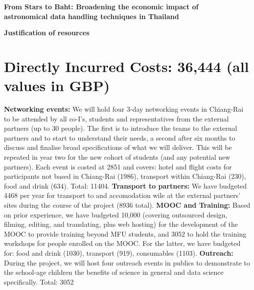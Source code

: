 \documentclass[11pt]{article}
\begin{document}
  \setcounter{figure}{0}
  \noindent
  {\LARGE \bf From Stars to Baht: Broadening the economic impact of \\
  astronomical data handling techniques in Thailand}
  
  \vspace{3mm}
  \noindent
  {\LARGE \bf Justification of resources }
  \vspace{-3mm}
  \section{Directly Incurred Costs: 36,444 (all values in GBP)}
  \vspace{-3mm}
  {\bf Networking events:} We will hold four 3-day networking events in Chiang-Rai to be attended by all co-I's, students and representatives from the external partners (up to 30 people). The first is to introduce the teams to the external partners and to start to understand their needs, a second after six months to discuss and finalise broad specifications of what we will deliver. This will be repeated in year two for the new cohort of students (and any potential new partners). Each event is costed at 2851 and covers: hotel and flight costs for participants not based in Chiang-Rai (1986), transport within Chiang-Rai (230), food and drink (634). Total: 11404. {\bf Transport to partners:} We have budgeted 4468 per year for transport to and accomodation wile at the external partners' sites during the course of the project (8936 total). {\bf MOOC and Training:} Based on prior experience, we have budgeted 10,000 (covering outsourced design, filming, editing, and translating, plus web hosting) for the development of the MOOC to provide training beyond MFU students, and 3052 to hold the training workshops for people enrolled on the MOOC. For the latter, we have budgeted for: food and drink (1030), transport (919), consumables (1103). {\bf Outreach:} During the project, we will host four outreach events in publics to demonstrate to the school-age children the benefits of science in general and data science specifically. Total: 3052
  
  \vspace{-3mm}
\end{document}
